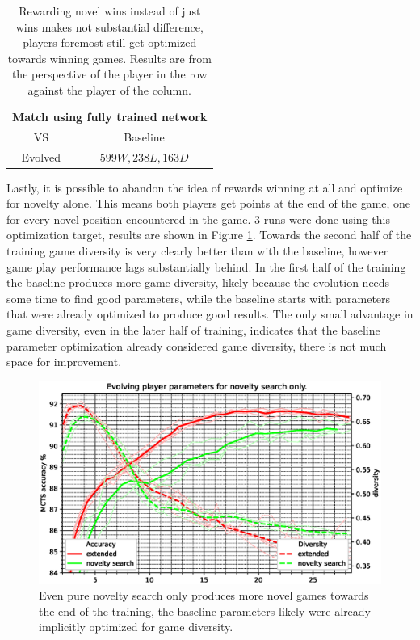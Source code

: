 \documentclass[12pt,onecolumn,oneside,titlepage]{article}
\begin{document}
\begin{table} [H]
 \centering

  \begin{tabular}{ c c }
  \multicolumn{2}{c}{\textbf{Match using fully trained network}} \\
	      VS & Baseline  \\
  \hline
  Evolved & $599W, 238L, 163D$
  \end{tabular}
  
  \caption{Rewarding novel wins instead of just wins makes not substantial difference, players foremost still get optimized towards winning games. Results are from the perspective of the player in the row against the player of the column.}
  \label{t:novel_win_fail}
\end{table}

Lastly, it is possible to abandon the idea of rewards winning at all and optimize for novelty alone. This means both players get points at the end of the game, one for every novel position encountered in the game. $3$ runs were done using this optimization target,
results are shown in Figure \ref{fig:pure_novelty_search}. Towards the second half of the training game diversity is very clearly better than with the baseline, however game play performance lags substantially behind.
In the first half of the training the baseline produces more game diversity, likely because the evolution needs some time to find good parameters, while the baseline starts with parameters that were already optimized to produce good results.
The only small advantage in game diversity, even in the later half of training, indicates that the baseline parameter optimization already considered game diversity, there is not much space for improvement.

\begin{figure}[H]
\centering
\includegraphics[clip,width=\columnwidth]{pure_novelty_search}
\caption{Even pure novelty search only produces more novel games towards the end of the training, the baseline parameters likely were already implicitly optimized for game diversity.}
\label{fig:pure_novelty_search}
\end{figure}
\end{document}
